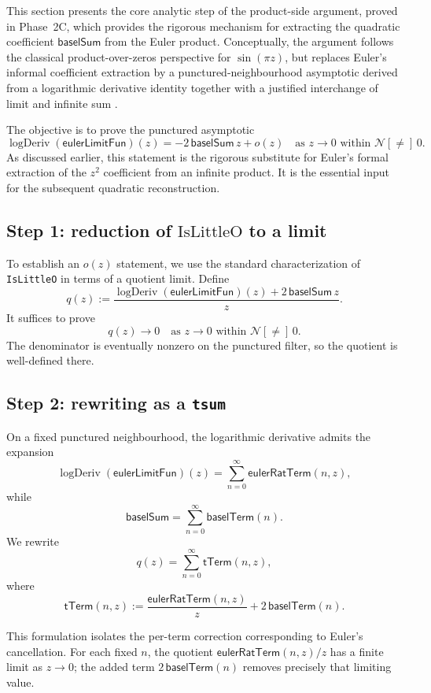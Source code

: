\documentclass[11pt,a4paper]{article}
\theoremstyle{plain}
\theoremstyle{definition}
\newcommand{\nhdsPunct}[1]{\ensuremath{\mathcal{N}[{\neq}]\,#1}}
\newcommand{\baselSum}{\ensuremath{\mathsf{baselSum}}}
\newcommand{\baselTerm}{\ensuremath{\mathsf{baselTerm}}}
\newcommand{\eulerLimitFun}{\ensuremath{\mathsf{eulerLimitFun}}}
\DeclareMathOperator{\logDeriv}{logDeriv}
\begin{document}
This section presents the core analytic step of the product-side argument, proved in Phase~2C, which provides the rigorous mechanism for extracting the quadratic coefficient \baselSum{} from the Euler product. Conceptually, the argument follows the classical product-over-zeros perspective for \(\sin(\pi z)\), but replaces Euler’s informal coefficient extraction by a punctured-neighbourhood asymptotic derived from a logarithmic derivative identity together with a justified interchange of limit and infinite sum \cite{WeierstrassProductNotesToronto}.

The objective is to prove the punctured asymptotic
\[
\logDeriv(\eulerLimitFun)(z)
=
-2\,\baselSum\, z
+ o(z)
\quad
\text{as } z \to 0 \text{ within } \nhdsPunct{0}.
\]
As discussed earlier, this statement is the rigorous substitute for Euler’s formal extraction of the \(z^{2}\) coefficient from an infinite product. It is the essential input for the subsequent quadratic reconstruction.

\subsection{Step 1: reduction of \texorpdfstring{$\mathrm{IsLittleO}$}{IsLittleO} to a limit}

To establish an \(o(z)\) statement, we use the standard characterization of \texttt{IsLittleO} in terms of a quotient limit. Define
\[
q(z)
:=
\frac{\logDeriv(\eulerLimitFun)(z) + 2\,\baselSum\, z}{z}.
\]
It suffices to prove
\[
q(z) \to 0
\quad
\text{as } z \to 0 \text{ within } \nhdsPunct{0}.
\]
The denominator is eventually nonzero on the punctured filter, so the quotient is well-defined there.

\subsection{Step 2: rewriting as a \texorpdfstring{\texttt{tsum}}{tsum}}

On a fixed punctured neighbourhood, the logarithmic derivative admits the expansion
\[
\logDeriv(\eulerLimitFun)(z)
=
\sum_{n=0}^{\infty} \mathsf{eulerRatTerm}(n,z),
\]
while
\[
\baselSum
=
\sum_{n=0}^{\infty} \baselTerm(n).
\]
We rewrite
\[
q(z)
=
\sum_{n=0}^{\infty} \mathsf{tTerm}(n,z),
\]
where
\[
\mathsf{tTerm}(n,z)
:=
\frac{\mathsf{eulerRatTerm}(n,z)}{z}
+
2\,\baselTerm(n).
\]

This formulation isolates the per-term correction corresponding to Euler’s cancellation. For each fixed \(n\), the quotient \(\mathsf{eulerRatTerm}(n,z)/z\) has a finite limit as \(z \to 0\); the added term \(2\,\baselTerm(n)\) removes precisely that limiting value.
\end{document}
